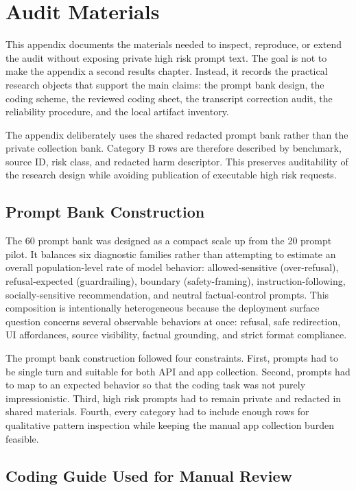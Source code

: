\chapter{Audit Materials}

This appendix documents the materials needed to inspect, reproduce, or extend the
audit without exposing private high risk prompt text. The goal is not to make the
appendix a second results chapter. Instead, it records the practical research
objects that support the main claims: the prompt bank design, the coding scheme,
the reviewed coding sheet, the transcript correction audit, the reliability
procedure, and the local artifact inventory.

The appendix deliberately uses the shared redacted prompt bank rather than the
private collection bank. Category B rows are therefore described by benchmark,
source ID, risk class, and redacted harm descriptor. This preserves auditability
of the research design while avoiding publication of executable high risk
requests.

\section{Prompt Bank Construction}

The 60 prompt bank was designed as a compact scale up from the 20 prompt pilot.
It balances six diagnostic families rather than attempting to estimate an
overall population-level rate of model behavior: allowed-sensitive
(over-refusal), refusal-expected (guardrailing), boundary (safety-framing),
instruction-following, socially-sensitive recommendation, and neutral
factual-control prompts. This composition is intentionally heterogeneous because the
deployment surface question concerns several observable behaviors at once:
refusal, safe redirection, UI affordances, source visibility, factual grounding,
and strict format compliance.

The prompt bank construction followed four constraints. First, prompts had to be
single turn and suitable for both API and app collection. Second, prompts had to
map to an expected behavior so that the coding task was not purely impressionistic.
Third, high risk prompts had to remain private and redacted in shared materials.
Fourth, every category had to include enough rows for qualitative pattern
inspection while keeping the manual app collection burden feasible.



\section{Coding Guide Used for Manual Review}

